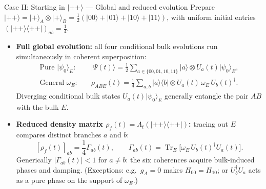 \documentclass[aspectratio=169,11pt]{beamer}
\newcommand{\ket}[1]{\lvert #1\rangle}
\newcommand{\bra}[1]{\langle #1\rvert}
\newcommand{\Tr}{\operatorname{Tr}}
\begin{document}
\begin{frame}{Case II: Starting in $\ket{++}$ --- Global and reduced evolution}
\small
Prepare $\ket{++}=\ket+_A\otimes\ket+_B=\tfrac12(\ket{00}+\ket{01}+\ket{10}+\ket{11})$, with uniform initial entries $(\ket{++}\bra{++})_{ab}=\tfrac14$.
\smallskip
\begin{itemize}\setlength\itemsep{5pt}
\item \textbf{Full global evolution:} all four conditional bulk evolutions run simultaneously in coherent superposition:
\begin{align*}
\text{Pure }\ket{\psi_0}_E:\quad &\ket{\Psi(t)}=\tfrac12\textstyle\sum_{a\in\{00,01,10,11\}}\ket a\otimes U_a(t)\ket{\psi_0}_E,\\[2pt]
\text{General }\omega_E:\quad &\rho_{ABE}(t)=\tfrac14\textstyle\sum_{a,b}\ket a\bra b\otimes U_a(t)\,\omega_E\,U_b(t)^\dagger.
\end{align*}
Diverging conditional bulk states $U_a(t)\ket{\psi_0}_E$ generally entangle the pair $AB$ with the bulk $E$.
\item \textbf{Reduced density matrix $\rho_f(t)=\Lambda_t(\ket{++}\bra{++})$:} tracing out $E$ compares distinct branches $a$ and $b$:
\[
\boxed{[\rho_f(t)]_{ab}=\frac14\Gamma_{ab}(t),\qquad
\Gamma_{ab}(t)=\Tr_E\bigl[\omega_E\,U_b(t)^\dagger U_a(t)\bigr].}
\]
Generically $\lvert\Gamma_{ab}(t)\rvert<1$ for $a\ne b$: the six coherences acquire bulk-induced phases and damping. (Exceptions: e.g.\ $g_A=0$ makes $H_{00}=H_{10}$; or $U_b^\dagger U_a$ acts as a pure phase on the support of $\omega_E$.)
\end{itemize}
\end{frame}
\end{document}
